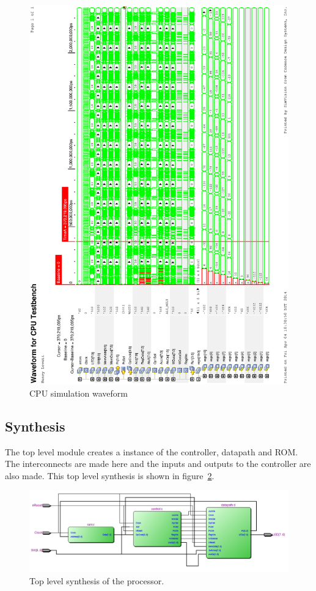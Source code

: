 
\begin{figure}
\includegraphics[height=\textheight-1cm]{Figures/cpusim.eps}
\caption{CPU simulation waveform}
\label{fig:cpusim}
\end{figure}

\subsection{Synthesis}

The top level module creates a instance of the controller, datapath and ROM. 
The interconnects are made here and the inputs and outputs to the controller are also made.
This top level synthesis is shown in figure~\ref{fig:cpusynth}.


\begin{figure}
\includegraphics[width=\textwidth]{Figures/cpusynth.png}
\caption{Top level synthesis of the processor.}
\label{fig:cpusynth}
\end{figure}

